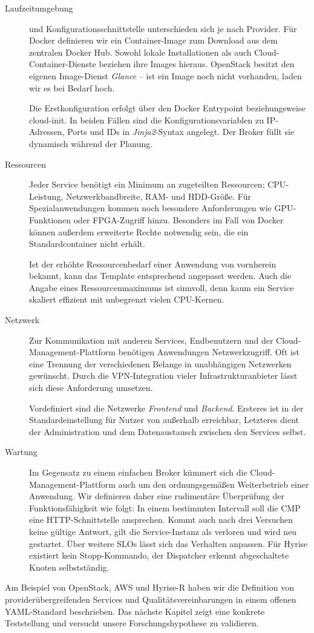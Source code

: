 \begin{description}
	\item[Laufzeitumgebung] und Konfigurationsschnittstelle unterschieden sich je nach Provider. Für Docker definieren wir ein Container-Image zum Download aus dem zentralen Docker Hub. Sowohl lokale Installationen als auch Cloud-Container-Dienste beziehen ihre Images hieraus. OpenStack besitzt den eigenen Image-Dienst \emph{Glance} -- ist ein Image noch nicht vorhanden, laden wir es bei Bedarf hoch.
	
	Die Erstkonfiguration erfolgt über den Docker Entrypoint beziehungsweise cloud-init. In beiden Fällen sind die Konfigurationsvariablen zu IP-Adressen, Ports und IDs in \emph{Jinja2}-Syntax angelegt. Der Broker füllt sie dynamisch während der Planung.
	
	\item[Ressourcen] Jeder Service benötigt ein Minimum an zugeteilten Ressourcen; CPU-Leistung, Netzwerkbandbreite, RAM- und HDD-Größe. Für Spezialanwendungen kommen noch besondere Anforderungen wie GPU-Funktionen oder FPGA-Zugriff hinzu. Besonders im Fall von Docker können außerdem erweiterte Rechte notwendig sein, die ein Standardcontainer nicht erhält. 
	
	Ist der erhöhte Ressourcenbedarf einer Anwendung von vornherein bekannt, kann das Template entsprechend angepasst werden. Auch die Angabe eines Ressourcenmaximums ist sinnvoll, denn kaum ein Service skaliert effizient mit unbegrenzt vielen CPU-Kernen.
	
	\item[Netzwerk] Zur Kommunikation mit anderen Services, Endbenutzern und der Cloud-Management-Plattform benötigen Anwendungen Netzwerkzugriff. Oft ist eine Trennung der verschiedenen Belange in unabhängigen Netzwerken gewünscht. Durch die VPN-Integration vieler Infrastrukturanbieter lässt sich diese Anforderung umsetzen. 
	
	Vordefiniert sind die Netzwerke \emph{Frontend} und \emph{Backend}. Ersteres ist in der Standardeinstellung für Nutzer von außerhalb erreichbar, Letzteres dient der Administration und dem Datenaustausch zwischen den Services selbst.
		
	\item[Wartung] Im Gegensatz zu einem einfachen Broker kümmert sich die Cloud-Management-Plattform auch um den ordnungsgemäßen Weiterbetrieb einer Anwendung. Wir definieren daher eine rudimentäre Überprüfung der Funktionsfähigkeit wie folgt: In einem bestimmten Intervall soll die CMP eine HTTP-Schnittstelle ansprechen. Kommt auch nach drei Versuchen keine gültige Antwort, gilt die Service-Instanz als verloren und wird neu gestartet. Über weitere SLOs lässt sich das Verhalten anpassen. Für Hyrise existiert kein Stopp-Kommando, der Dispatcher erkennt abgeschaltete Knoten selbstständig.
	
\end{description}

\noindent
Am Beispiel von OpenStack, AWS und Hyrise-R haben wir die Definition von providerübergreifenden Services und Qualitätsvereinbarungen in einem offenen YAML-Standard beschrieben. Das nächste Kapitel zeigt eine konkrete Teststellung und versucht unsere Forschungshypothese zu validieren.